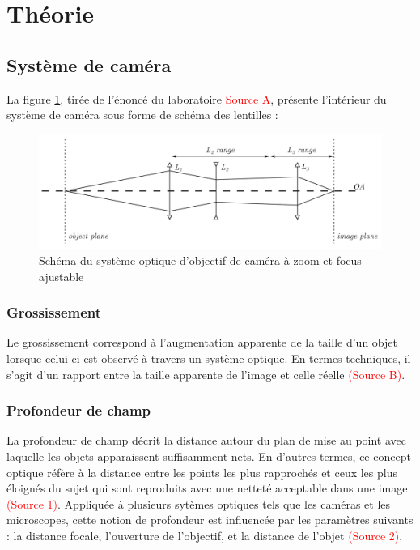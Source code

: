 \documentclass[11pt,letterpaper]{article}
\begin{document}
\section{Théorie}

\subsection{Système de caméra}

La figure \ref{schema_syst}, tirée de l'énoncé du laboratoire \textcolor{red}{Source A}, présente
l'intérieur du système de caméra sous forme de schéma des lentilles :

\begin{figure}[H]
  \centering
  \includegraphics[scale=0.1]{systeme_optique.png}
  \caption{Schéma du système optique d'objectif de caméra à zoom et focus ajustable}
  \label{schema_syst}
\end{figure}


\subsubsection{Grossissement}
Le grossissement correspond à l'augmentation apparente de la taille d'un objet lorsque celui-ci est observé à travers un système optique. En termes techniques, il s'agit d'un rapport entre la taille apparente de l'image et celle réelle \textcolor{red}{(Source B)}.


\subsubsection{Profondeur de champ}
La profondeur de champ décrit la distance autour du plan de mise au point avec laquelle les objets apparaissent suffisamment nets. En d'autres termes, ce concept optique réfère à la distance entre les points les plus rapprochés et ceux les plus éloignés du sujet qui sont reproduits avec une netteté acceptable dans une image \textcolor{red}{(Source 1)}. Appliquée à plusieurs sytèmes optiques tels que les caméras et les microscopes, cette notion de profondeur est influencée par les paramètres suivants : la distance focale, l'ouverture de l'objectif, et la distance de l'objet \textcolor{red}{(Source 2)}. 
\end{document}

